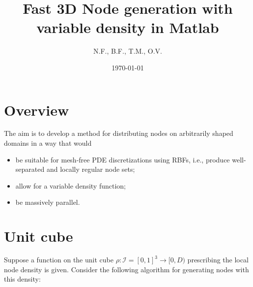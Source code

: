 \documentclass[10pt]{amsart}
\title{Fast 3D Node generation with variable density in Matlab}
\author{N.F., B.F., T.M., O.V.}
\date{\today}
\begin{document}
\maketitle

\section{Overview}
The aim is to develop a method for distributing nodes on arbitrarily shaped domains in a way that would 
\begin{itemize}
 \item be suitable for mesh-free PDE discretizations using RBFs, i.e., produce well-separated and locally regular node sets;
 \item allow for a variable density function;
 \item be massively parallel.
\end{itemize}
\section{Unit cube}

Suppose a function on the unit cube  $\rho: \mathcal{I} =[0,1]^3 \to [0,D)$ prescribing the local node density is given.  Consider the following algorithm for generating nodes with this density: 
\end{document}
